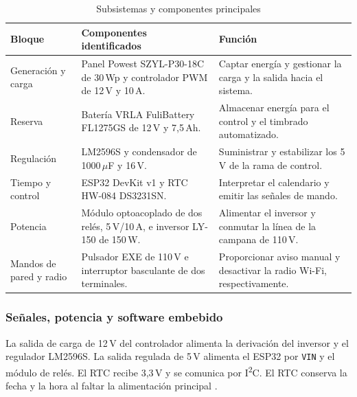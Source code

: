 \documentclass[a4paper,11pt]{article}
\newcommand{\senal}[1]{\texttt{#1}}
\begin{document}
\begin{table}[H]
\centering\small
\caption{Subsistemas y componentes principales}
\begin{tabularx}{\linewidth}{@{}P{2.52cm}P{5.35cm}Y@{}}
\toprule
\textbf{Bloque} & \textbf{Componentes identificados} & \textbf{Función} \\
\midrule
Generación y carga & Panel Powest SZYL-P30-18C de 30\,Wp y controlador PWM de 12\,V y 10\,A. & Captar energía y gestionar la carga y la salida hacia el sistema. \\
Reserva & Batería VRLA FuliBattery FL1275GS de 12\,V y 7,5\,Ah. & Almacenar energía para el control y el timbrado automatizado. \\
Regulación & LM2596S y condensador de 1000\,$\mu$F y 16\,V. & Suministrar y estabilizar los 5\,V de la rama de control. \\
Tiempo y control & ESP32 DevKit v1 y RTC HW-084 DS3231SN. & Interpretar el calendario y emitir las señales de mando. \\
Potencia & Módulo optoacoplado de dos relés, 5\,V/10\,A, e inversor LY-150 de 150\,W. & Alimentar el inversor y conmutar la línea de la campana de 110\,V. \\
Mandos de pared y radio & Pulsador EXE de 110\,V e interruptor basculante de dos terminales. & Proporcionar aviso manual y desactivar la radio Wi-Fi, respectivamente. \\
\bottomrule
\end{tabularx}
\end{table}

\clearpage
\subsubsection{Señales, potencia y software embebido}
La salida de carga de 12\,V del controlador alimenta la derivación del inversor y el regulador LM2596S. La salida regulada de 5\,V alimenta el ESP32 por \senal{VIN} y el módulo de relés. El RTC recibe 3,3\,V y se comunica por I\textsuperscript{2}C. El RTC conserva la fecha y la hora al faltar la alimentación principal \cite{ficha,diagrama}.
\end{document}
